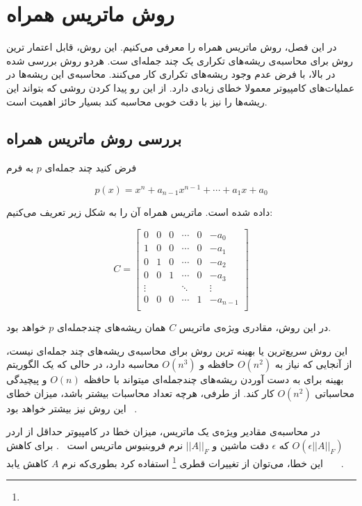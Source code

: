 \chapter{روش ماتریس همراه}

در این فصل، روش ماتریس همراه را معرفی می‌کنیم.
این روش، قابل اعتمار ترین روش برای محاسبه‌ی ریشه‌های تکراری یک چند جمله‌ای ست.
هردو روش بررسی شده در بالا، با فرض عدم وجود ریشه‌های تکراری کار می‌کنند.
محاسبه‌ی این ریشه‌ها در عملیات‌های کامپیوتر معمولا خطای زیادی دارد.
از این رو پیدا کردن روشی که بتواند این ریشه‌ها را نیز با دقت خوبی محاسبه کند بسیار حائز اهمیت است.

\section{بررسی روش ماتریس همراه}
فرض کنید چند جمله‌ای
$p$
به فرم

\begin{equation}
  p(x) = x^n + a_{n-1} x^{n-1} + \cdots + a_1 x + a_0
\end{equation}

داده شده است.
ماتریس همراه آن را به شکل زیر تعریف می‌کنیم:

\begin{equation}
  C =
    \begin{bmatrix}
      0 & 0 & 0 & \cdots & 0 & -a_0 \\
      1 & 0 & 0 & \cdots & 0 & -a_1 \\
      0 & 1 & 0 & \cdots & 0 & -a_2 \\
      0 & 0 & 1 & \cdots & 0 & -a_3 \\
      \vdots &  &  & \ddots & & \vdots \\
      0 & 0 & 0 & \cdots & 1 & -a_{n-1} \\

    \end{bmatrix}
\end{equation}


در این روش، مقادری ویژه‌ی ماتریس
$C$
همان ریشه‌های چندجمله‌ای
$p$
خواهد بود.

این روش سریع‌ترین یا بهینه ترین روش برای محاسبه‌ی ریشه‌های چند جمله‌ای نیست، از آنجایی که
نیاز به
$O(n^2)$
حافظه و
$O(n^3)$
محاسبه دارد، در حالی که یک الگوریتم بهینه برای به دست آوردن ریشه‌های چندجمله‌ای میتواند با حافظه
$O(n)$
و پیچیدگی محاسباتی
$O(n^2)$
کار کند.
از طرفی، هرچه تعداد محاسبات بیشتر باشد، میزان خطای این روش نیز بیشتر خواهد بود~\cite{moler1991cleve}
.

در محاسبه‌ی مقادیر ویژه‌ی یک ماتریس، میزان خطا در کامپیوتر حداقل از اردر
$O(\epsilon ||A||_F)$
که
$\epsilon$
دقت ماشین و
$||A||_F$
نرم فروبنیوس ماتریس است~\cite{osborne1960pre}
.
برای کاهش این خطا، می‌توان از تغییرات قطری
\footnote{}
استفاده کرد بطوری‌که نرم
$A$
کاهش یابد~\cite{beresford1969}~\cite{james2014matrix}~\cite{osborne1960pre}
.

